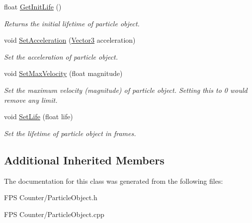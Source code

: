 \begin{DoxyCompactItemize}
float \mbox{\hyperlink{class_particle_object_a47bfcd02614d825170995695cda65173}{Get\+Init\+Life}} ()
\begin{DoxyCompactList}\small\item\em Returns the initial lifetime of particle object. \end{DoxyCompactList}\item 
\mbox{\label{class_particle_object_aac0db7533558c053544874257c1e2084}} 
void \mbox{\hyperlink{class_particle_object_aac0db7533558c053544874257c1e2084}{Set\+Acceleration}} (\mbox{\hyperlink{class_vector3}{Vector3}} acceleration)
\begin{DoxyCompactList}\small\item\em Set the acceleration of particle object. \end{DoxyCompactList}\item 
\mbox{\label{class_particle_object_af778cead64627866bbd7a8a3140e42d3}} 
void \mbox{\hyperlink{class_particle_object_af778cead64627866bbd7a8a3140e42d3}{Set\+Max\+Velocity}} (float magnitude)
\begin{DoxyCompactList}\small\item\em Set the maximum velocity (magnitude) of particle object. Setting this to 0 would remove any limit. \end{DoxyCompactList}\item 
\mbox{\label{class_particle_object_a4903b5643e136f02384eba6a38dfd624}} 
void \mbox{\hyperlink{class_particle_object_a4903b5643e136f02384eba6a38dfd624}{Set\+Life}} (float life)
\begin{DoxyCompactList}\small\item\em Set the lifetime of particle object in frames. \end{DoxyCompactList}\end{DoxyCompactItemize}
\subsection*{Additional Inherited Members}


The documentation for this class was generated from the following files\+:\begin{DoxyCompactItemize}
\item 
F\+P\+S Counter/Particle\+Object.\+h\item 
F\+P\+S Counter/Particle\+Object.\+cpp\end{DoxyCompactItemize}
